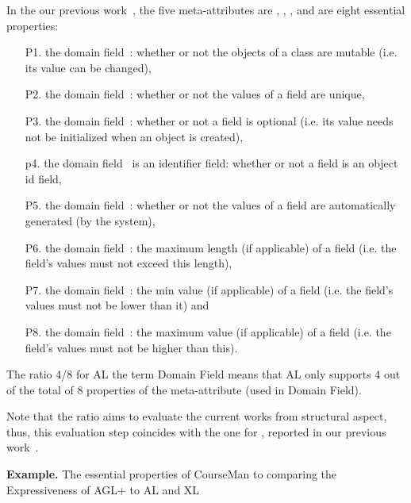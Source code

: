 	In the our previous work~\cite{le_domain_2018}, the five meta-attributes are , , ,  and  are eight  essential properties: 
	\begin{enumerate}
		\item[P1.] the domain field~: whether or not the objects of a class are mutable  (i.e. its value can be changed),
		\item[P2.] the domain field~: whether or not the values of a field are unique,
		\item[P3.] the domain field~: whether or not a field is optional (i.e. its value needs not be initialized when an object is created),
		\item[p4.] the domain field~ is an identifier field: whether or not a field is an object id field,
		\item[P5.] the domain field~: whether or not the values of a field are automatically generated (by the system),
		\item[P6.] the domain field~: the maximum length (if applicable) of a field (i.e. the field’s values must not exceed this length),
		\item[P7.] the domain field~:  the min value (if applicable) of a field (i.e. the field’s values must not be lower than it) and
		\item[P8.] the domain field~:  the maximum value (if applicable) of a field (i.e. the field’s values must not be higher than this).
				
	\end{enumerate}
	The ratio 4/8 for AL \wrt the term Domain Field means that AL only supports 4 out of the total of 8 properties of the meta-attribute  (used in Domain Field). 
	
	Note that the ratio aims to evaluate the current works from structural aspect, thus, this evaluation step coincides with the one for \dcsl, reported in our previous work~\cite{le_domain_2018}. %
	
	\noindent\textbf{Example.} The essential properties of CourseMan to comparing the Expressiveness of AGL+ to AL and XL
	
